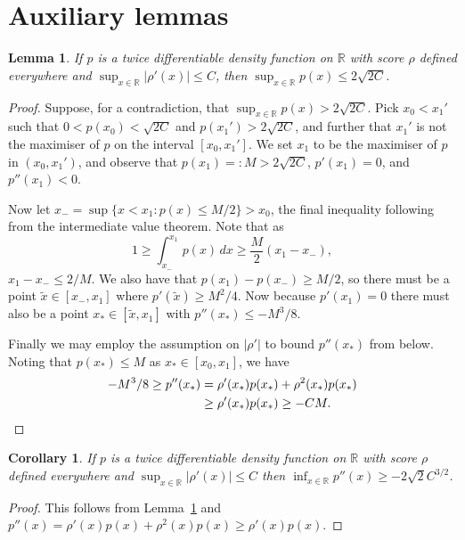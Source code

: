 \documentclass[aos]{imsart}
\newcommand{\R}{\mathbb{R}}
\newtheorem{corollary}[theorem]{Corollary}
\newtheorem{lemma}[theorem]{Lemma}
\begin{document}
	\section{Auxiliary lemmas} \label{app:aux_Lemmas}
	\begin{lemma}
		\label{lem:pbounded}
		If $p$ is a twice differentiable density function on $\R$ with score $\rho$ defined everywhere and $\sup_{x\in\R} |\rho'(x)| \leq C$, then $\sup_{x\in\R} p(x) \leq 2\sqrt{2C}$. 
	\end{lemma}
	\begin{proof}
		Suppose, for a contradiction, that $\sup_{x\in\R} p(x) > 2\sqrt{2C}$. Pick $x_0 < x_1'$ such that $0<p(x_0) < \sqrt{2C}$ and $p(x_1')>2\sqrt{2C}$, and further that $x_1'$ is not the maximiser of $p$ on the interval $[x_0,x_1']$. We set $x_1$ to be the maximiser of $p$ in $(x_0, x_1')$, and observe that $p(x_1)=:M > 2\sqrt{2C}$, $p'(x_1) = 0$, and  $p''(x_1) < 0$.
		
		Now let $x_- = \sup\{x<x_1: p(x)\leq M/2\} > x_0$, the final inequality following from the intermediate value theorem. Note that as
		\[
		1 \geq \int_{x_-}^{x_1} p(x) \, dx \geq \frac{M}{2} (x_1 - x_-),
		\]
		$x_1 - x_- \leq 2/M$.
		We also have that $p(x_1)-p(x_-)\geq M/2$, so there must be a point $\tilde x \in [x_-, x_1]$ where $p'(\tilde x) \geq M^2/4$. Now because $p'(x_1)=0$ there must also be a point $x_* \in [\tilde x, x_1]$ with $p''(x_*)\leq -M^3/8$.
		
		Finally we may employ the assumption on $|\rho'|$ to bound $p''(x_*)$ from below. Noting that $p(x_*)\leq M$ as $x_* \in [x_0, x_1]$, we have
		\begin{align*}
			-M^3/8 \geq p''(x_*) &= \rho'(x_*)p(x_*) + \rho^2(x_*)p(x_*)\\
			&\geq \rho'(x_*)p(x_*) \geq -CM. \qedhere
		\end{align*}
	\end{proof}
	
	\begin{corollary}
		\label{lem:p''bounded}
		If $p$ is a twice differentiable density function on $\R$ with score $\rho$ defined everywhere and $\sup_{x\in\R} |\rho'(x)| \leq C$ then $\inf_{x\in\R} p''(x) \geq -2\sqrt{2}C^{3/2}$. 
	\end{corollary}
	\begin{proof}
		This follows from Lemma~\ref{lem:pbounded} and       $p''(x) = \rho'(x)p(x) + \rho^2(x)p(x)\geq \rho'(x)p(x)$.
	\end{proof}
	
\end{document}
